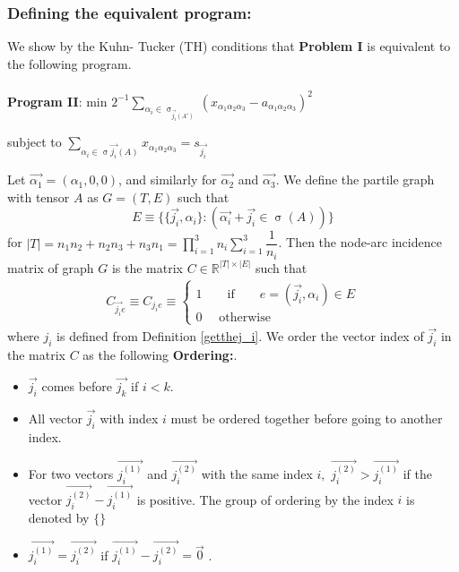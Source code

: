 \documentclass{article}
\begin{document}
\subsubsection{Defining the equivalent program:}
We show by the Kuhn- Tucker (TH) conditions that \textbf{Problem I} is equivalent to the following program.
\\\\
\textbf{Program II}: min $2^{-1}\sum_{\alpha_i \in \upsigma_{\Vec{j_i}(A')}} (x_{\alpha_1\alpha_2\alpha_3} - a_{\alpha_1\alpha_2\alpha_3})^2$ \\
\begin{center}
 subject to  $\sum\limits_{\alpha_i \in \upsigma{\Vec{j_i}(A)}} x_{\alpha_1\alpha_2\alpha_3} = s_{\Vec{j_i}} $
    
\end{center}
Let $\Vec{\alpha_1} =(\alpha_1, 0,0)$, and similarly for $\Vec{\alpha_2}$ and $\Vec{\alpha_3}.$ We define the partile graph with tensor $A$ as $G= (T,E)$ such that 
$$E\equiv \{\{\Vec{j_i}, \alpha_i\}: (\Vec{\alpha_i} + \Vec{j_i} \in \upsigma(A)) \}$$ 
for $|T| = n_1n_2 + n_2n_3 + n_3n_1 =  \prod\limits_{i=1}^{3}n_i\sum\limits_{i=1}^{3}\dfrac{1}{n_i}$. Then the node-arc incidence matrix of graph $G$ is the matrix $C \in \mathbb{R}^{|T|\times |E|}$ such that 
\begin{eqnarray*}
C_{\Vec{j_i}e} \equiv C_{j_i e} \equiv  \left\{ 
\begin{array}{c}
1 \qquad \text{if} \qquad e = (\Vec{j_i}, \alpha_i) \in E  \\ 
0 \quad \text{  otherwise }
\end{array}
\right.
\end{eqnarray*}
where $j_i$ is defined from Definition \ref{getthej_i}. We order the vector index of $\Vec{j_i}$ in the matrix $C$ as the following \textbf{Ordering:}.
\begin{itemize}
    \item $\Vec{j_i}$ comes before $\Vec{j_k}$ if $i < k$.
    \item All vector $\Vec{j_i}$ with index $i$ must be ordered together before going to another index.
    \item For two vectors $\Vec{j_i^{(1)}}$ and $\Vec{j_i^{(2)}}$ with the same index $i,$ $\Vec{j_i^{(2)}} > \Vec{j_i^{(1)}}$ if the vector $\Vec{j_i^{(2)}}- \Vec{j_i^{(1)}}$ is positive. The group of ordering by the index $i$ is denoted by $\{ \}$
    \item $\Vec{j_i^{(1)}} = \Vec{j_i^{(2)}}$ if $\Vec{j_i^{(1)}} - \Vec{j_i^{(2)}} = \Vec{0}$ .
\end{itemize}{}
\end{document}
